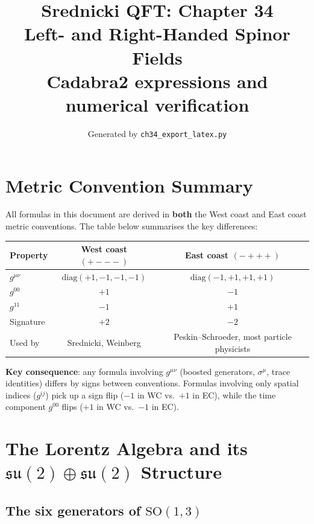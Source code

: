 \documentclass[12pt]{article}
\title{\textbf{Srednicki QFT: Chapter 34}\\[6pt]
       \large Left- and Right-Handed Spinor Fields\\[4pt]
       \normalsize Cadabra2 expressions and numerical verification}
\author{Generated by \texttt{ch34\_export\_latex.py}}
\date{}
\theoremstyle{remark}
\begin{document}
\maketitle

\section*{Metric Convention Summary}

All formulas in this document are derived in \textbf{both} the West coast and East coast
metric conventions. The table below summarises the key differences:

\medskip
\begin{center}
\renewcommand{\arraystretch}{1.4}
\begin{tabular}{@{}lcc@{}}
  \toprule
  Property & West coast $(+{-}{-}{-})$ & East coast $(-{+}{+}{+})$ \\
  \midrule
  $g^{\mu\nu}$ & $\mathrm{diag}(+1,-1,-1,-1)$ & $\mathrm{diag}(-1,+1,+1,+1)$ \\
  $g^{00}$ & $+1$ & $-1$ \\
  $g^{11}$ & $-1$ & $+1$ \\
  Signature & $+2$ & $-2$ \\
  Used by & Srednicki, Weinberg & Peskin--Schroeder, most particle physicists \\
  \bottomrule
\end{tabular}
\end{center}
\medskip

\noindent\textbf{Key consequence}: any formula involving $g^{\mu\nu}$ (boosted generators,
$\sigma^\mu$, trace identities) differs by signs between conventions.
Formulas involving only spatial indices ($g^{ij}$) pick up a sign flip
($-1$ in WC vs.\ $+1$ in EC), while the time component $g^{00}$ flips
($+1$ in WC vs.\ $-1$ in EC).

\tableofcontents
\newpage

\section{The Lorentz Algebra and its
  \texorpdfstring{$\mathfrak{su}(2)\oplus\mathfrak{su}(2)$}{su(2)+su(2)}
  Structure}

\subsection{The six generators of \texorpdfstring{$\mathrm{SO}(1,3)$}{SO(1,3)}}
\end{document}
